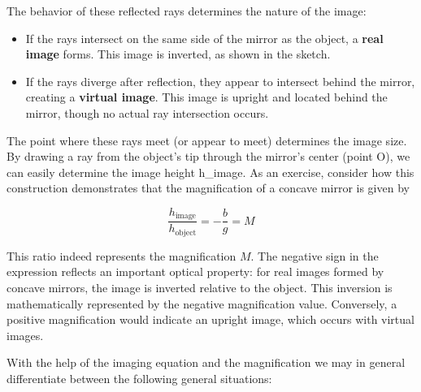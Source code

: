 \documentclass[
  a4paper,
]{book}
\providecommand{\tightlist}{%
  \setlength{\itemsep}{0pt}\setlength{\parskip}{0pt}}
\begin{document}
The behavior of these reflected rays determines the nature of the image:

\begin{itemize}
\tightlist
\item
  If the rays intersect on the same side of the mirror as the object, a
  \textbf{real image} forms. This image is inverted, as shown in the
  sketch.
\item
  If the rays diverge after reflection, they appear to intersect behind
  the mirror, creating a \textbf{virtual image}. This image is upright
  and located behind the mirror, though no actual ray intersection
  occurs.
\end{itemize}

The point where these rays meet (or appear to meet) determines the image
size. By drawing a ray from the object's tip through the mirror's center
(point O), we can easily determine the image height h\_image. As an
exercise, consider how this construction demonstrates that the
magnification of a concave mirror is given by

\[ \frac{h_{\text{image}}}{h_{\text{object}}}=-\frac{b}{g}=M\]

This ratio indeed represents the magnification \(M\). The negative sign
in the expression reflects an important optical property: for real
images formed by concave mirrors, the image is inverted relative to the
object. This inversion is mathematically represented by the negative
magnification value. Conversely, a positive magnification would indicate
an upright image, which occurs with virtual images.

With the help of the imaging equation and the magnification we may in
general differentiate between the following general situations:
\end{document}
